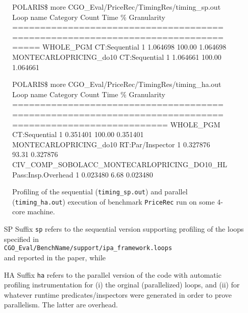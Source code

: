 \documentclass{sig-alternate}
\begin{document}
\begin{figure*}[t]
\begin{colorcode}
POLARIS\$ more CGO\_Eval/PriceRec/TimingRes/timing\_sp.out
             Loop name      Category   Count      Time       \%       Granularity
=================================================================================
             WHOLE\_PGM   CT:Sequential    1     1.064698   100.00      1.064698
MONTECARLOPRICING\_do10   CT:Sequential    1     1.064661   100.00      1.064661



POLARIS\$ more CGO_Eval/PriceRec/TimingRes/timing\_ha.out
                                 Loop name          Category   Count  Time        \%    Granularity
========================================================================================================
                                 WHOLE_PGM        CT:Sequential  1   0.351401   100.00   0.351401
                    MONTECARLOPRICING_do10     RT:Par/Inspector  1   0.327876    93.31   0.327876
CIV_COMP_SOBOLACC_MONTECARLOPRICING_DO10_HL  Pass:Insp.Overhead  1   0.023480     6.68   0.023480
\end{colorcode}
\caption{Profiling of the sequential ({\tt timing\_sp.out}) and parallel ({\tt timing\_ha.out}) execution of benchmark {\tt PriceRec} run on some $4$-core machine.}
\label{fig:ListingHAandSP} %
\end{figure*}


\begin{itemize}
    \item[SP] Suffix {\tt sp} refers to the sequential version supporting 
                profiling of the loops specified in\\
                {\tt CGO\_Eval/BenchName/support/ipa\_framework.loops}\\
                and reported in the paper, while
    \item[HA] Suffix {\tt ha} refers to the parallel version of the code with 
                automatic profiling instrumentation for (i) the orginal (parallelized) 
                loops, and (ii) for whatever runtime predicates/inspectors were 
                generated in order to prove parallelism.  The latter are overhead.
\end{itemize}
\end{document}
